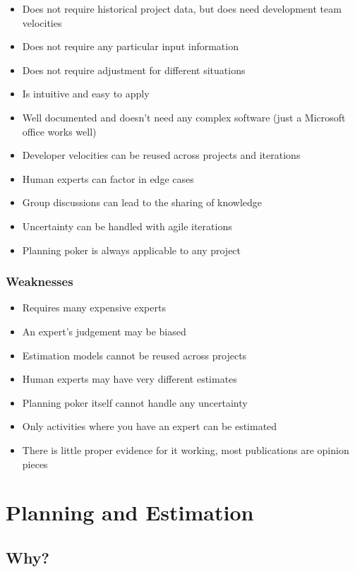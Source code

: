\begin{itemize}
	\item Does not require historical project data, but does need development team velocities
	\item Does not require any particular input information
	\item Does not require adjustment for different situations
	\item Is intuitive and easy to apply
	\item Well documented and doesn't need any complex software (just a Microsoft office works well)
	\item Developer velocities can be reused across projects and iterations
	\item Human experts can factor in edge cases
	\item Group discussions can lead to the sharing of knowledge
	\item Uncertainty can be handled with agile iterations
	\item Planning poker is always applicable to any project
\end{itemize}

\subsubsection{Weaknesses}\label{ssub:weaknesses}

\begin{itemize}
	\item Requires many expensive experts
	\item An expert's judgement may be biased
	\item Estimation models cannot be reused across projects
	\item Human experts may have very different estimates
	\item Planning poker itself cannot handle any uncertainty
	\item Only activities where you have an expert can be estimated
	\item There is little proper evidence for it working, most publications are opinion pieces
\end{itemize}

\section{Planning and Estimation}\label{sec:planning_and_estimation}

\subsection{Why?}\label{sub:why_}

